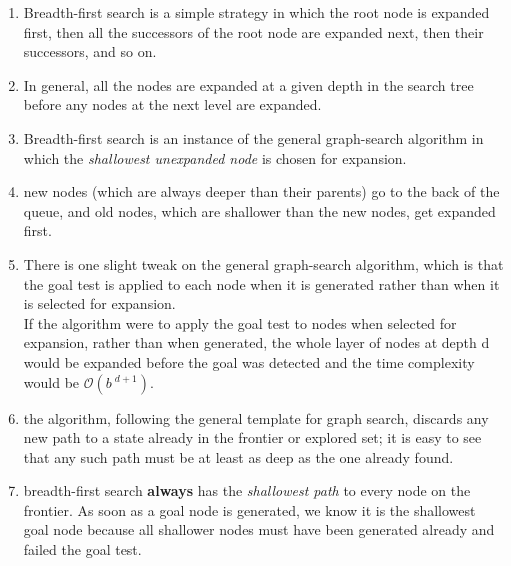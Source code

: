 \begin{enumerate}[itemsep=0.2cm]
    \item Breadth-first search is a simple strategy in which the root node is expanded first, then all the successors of the root node are expanded next, then their successors, and so on. 
    \hfill \cite{ai/book/Artificial-Intelligence-A-Modern-Approach/Russell-Norvig}

    \item In general, all the nodes are expanded at a given depth in the search tree before any nodes at the next level are expanded.
    \hfill \cite{ai/book/Artificial-Intelligence-A-Modern-Approach/Russell-Norvig}

    \item Breadth-first search is an instance of the general graph-search algorithm in which the \textit{shallowest unexpanded node} is chosen for expansion.
    \hfill \cite{ai/book/Artificial-Intelligence-A-Modern-Approach/Russell-Norvig}

    \item new nodes (which are always deeper than their parents) go to the back of the queue, and old nodes, which are shallower than the new nodes, get expanded first. 
    \hfill \cite{ai/book/Artificial-Intelligence-A-Modern-Approach/Russell-Norvig}

    \item There is one slight tweak on the general graph-search algorithm, which is that the goal test is applied to each node when it is generated rather than when it is selected for expansion.
    \hfill \cite{ai/book/Artificial-Intelligence-A-Modern-Approach/Russell-Norvig}
    \\
    If the algorithm were to apply the goal test to nodes when selected for expansion, rather than when generated, the whole layer of nodes at depth d would be expanded before the goal was detected and the time complexity would be $\mathcal{O}(b\ ^{d+1})$.
    \hfill \cite{ai/book/Artificial-Intelligence-A-Modern-Approach/Russell-Norvig}

    \item the algorithm, following the general template for graph search, discards any new path to a state already in the frontier or explored set; it is easy to see that any such path must be at least as deep as the one already found. 
    \hfill \cite{ai/book/Artificial-Intelligence-A-Modern-Approach/Russell-Norvig}

    \item breadth-first search \textbf{always} has the \textit{shallowest path} to every node on the frontier. 
    As soon as a goal node is generated, we know it is the shallowest goal node because all shallower nodes must have been generated already and failed the goal test. 
    \hfill \cite{ai/book/Artificial-Intelligence-A-Modern-Approach/Russell-Norvig}


\end{enumerate}
